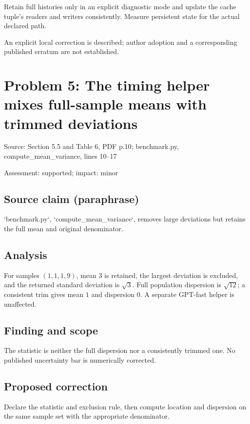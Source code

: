 \documentclass[11pt]{article}
\begin{document}
Retain full histories only in an explicit diagnostic mode and update the cache tuple’s readers and writers consistently. Measure persistent state for the actual declared path.

An explicit local correction is described; author adoption and a corresponding published erratum are not established.

\section*{Problem 5: The timing helper mixes full-sample means with trimmed deviations}

Source: Section 5.5 and Table 6, PDF p.10; benchmark.py, compute\_mean\_variance, lines 10–17

Assessment: supported; impact: minor

\subsection*{Source claim (paraphrase)}

`benchmark.py`, `compute\_mean\_variance`, removes large deviations but retains the full mean and original denominator.

\subsection*{Analysis}

For samples \((1,1,1,9)\), mean \(3\) is retained, the largest deviation is excluded, and the returned standard deviation is \(\sqrt3\). Full population dispersion is \(\sqrt{12}\); a consistent trim gives mean \(1\) and dispersion \(0\). A separate GPT-fast helper is unaffected.

\subsection*{Finding and scope}

The statistic is neither the full dispersion nor a consistently trimmed one. No published uncertainty bar is numerically corrected.

\subsection*{Proposed correction}

Declare the statistic and exclusion rule, then compute location and dispersion on the same sample set with the appropriate denominator.
\end{document}
